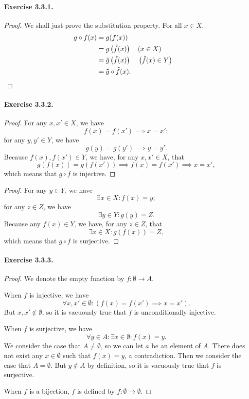 \paragraph{Exercise 3.3.1.}
\begin{proof}
    We shall just prove the substitution property. For all $x\in X$, 
    \begin{align*}
        g\circ f(x) &= g(f(x)) \\&= g\left(\tilde{f}(x)\right) && (x\in X)
        \\&= \tilde{g}\left(\tilde{f}(x)\right) && \left(\tilde{f}(x) \in Y\right)
        \\&= \tilde{g}\circ \tilde{f}(x). \qedhere
    \end{align*}
\end{proof}

\paragraph{Exercise 3.3.2.}
\begin{proof}
    For any $x,x'\in X$, we have \[ f(x) = f(x') \implies x=x';\] for any $y,y' \in Y$, we have \[ g(y) = g(y') \implies y=y'.\] Because $f(x),f(x')\in Y$, we have, for any $x,x'\in X$, that \[ g(f(x)) = g(f(x')) \implies f(x) = f(x') \implies x=x' ,\] which means that $g\circ f$ is injective.
\end{proof}
\begin{proof}
    For any $y\in Y$, we have \[ \exists x\in X : f(x)=y ;\] for any $z \in Z$, we have \[ \exists y\in Y : g(y)=Z.\] Because any $f(x)\in Y$, we have, for any $z\in Z$, that \[ \exists x\in X : g(f(x)) =Z, \] which means that $g\circ f$ is surjective.
\end{proof}

\paragraph{Exercise 3.3.3.}
\begin{proof}
    We denote the empty function by $f:\emptyset\to A$.

    When $f$ is injective, we have \[ \forall x,x'\in \emptyset: (f(x) = f(x') \implies x=x').\] But $x,x'\notin \emptyset$, so it is vacuously true that $f$ is unconditionally injective. 
    
    When $f$ is surjective, we have \[ \forall y \in A: \exists x\in \emptyset : f(x)=y.\] We consider the case that $A \neq \emptyset$, so we can let $a$ be an element of $A$. There does not exist any $x\in \emptyset$ such that $f(x)=y$, a contradiction. Then we consider the case that $A=\emptyset$. But $y\notin A$ by definition, so it is vacuously true that $f$ is surjective. 
    
    When $f$ is a bijection, $f$ is defined by $f:\emptyset\to\emptyset$.
\end{proof}